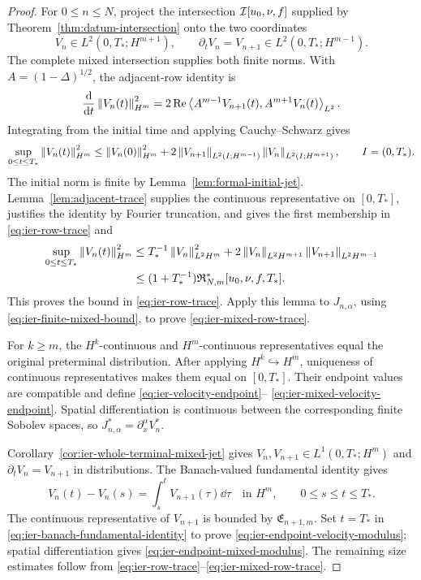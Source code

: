 \begin{proof}
For \(0\le n\le N\), project the intersection
\(\mathcal I[u_0,\nu,f]\) supplied by Theorem~\ref{thm:datum-intersection} onto the two
coordinates
\[
 V_n\in L^2(0,T_*;H^{m+1}),
 \qquad
 \partial_tV_n=V_{n+1}\in L^2(0,T_*;H^{m-1}).
\]
The complete mixed intersection supplies both finite norms.
With \(A=(1-\Delta)^{1/2}\), the adjacent-row identity is
\[
 \frac{\mathrm d}{\mathrm dt}\left\lVert V_n(t)\right\rVert_{H^m}^2
 =2\operatorname{Re}\left\langle A^{m-1}V_{n+1}(t),A^{m+1}V_n(t)\right\rangle_{L^2}.
\]
Integrating from the initial time and applying Cauchy--Schwarz gives
\begin{equation}
 \sup_{0\le t\le T_*}\left\lVert V_n(t)\right\rVert_{H^m}^2
 \le\left\lVert V_n(0)\right\rVert_{H^m}^2
 +2\left\lVert V_{n+1}\right\rVert_{L^2(I;H^{m-1})}
    \left\lVert V_n\right\rVert_{L^2(I;H^{m+1})},
 \qquad I=(0,T_*).
 \label{eq:ier-initial-row-trace-bound}
\end{equation}
The initial norm is finite by Lemma~\ref{lem:formal-initial-jet}.
Lemma~\ref{lem:adjacent-trace} supplies the continuous representative
on \([0,T_*]\), justifies the identity by Fourier truncation, and gives the
first membership in
\eqref{eq:ier-row-trace} and
\begin{align*}
 \sup_{0\le t\le T_*}\left\lVert V_n(t)\right\rVert_{H^m}^2
 &\le T_*^{-1}\left\lVert V_n\right\rVert_{L^2H^m}^2
 +2\left\lVert V_n\right\rVert_{L^2H^{m+1}}\left\lVert V_{n+1}\right\rVert_{L^2H^{m-1}}\\
 &\le(1+T_*^{-1})\mathfrak R_{N,m}^*[u_0,\nu,f,T_*].
\end{align*}
This proves the bound in \eqref{eq:ier-row-trace}.  Apply this lemma to
\(J_{n,\alpha}\), using \eqref{eq:ier-finite-mixed-bound}, to prove
\eqref{eq:ier-mixed-row-trace}.

For \(k\ge m\), the \(H^k\)-continuous and \(H^m\)-continuous
representatives equal the original preterminal distribution.  After applying
\(H^k\hookrightarrow H^m\), uniqueness of continuous representatives makes
them equal on \([0,T_*]\).  Their endpoint values are compatible and define
\eqref{eq:ier-velocity-endpoint}--%
\eqref{eq:ier-mixed-velocity-endpoint}.  Spatial differentiation is
continuous between the corresponding finite Sobolev spaces, so
\(J_{n,\alpha}^*=\partial_x^\alpha V_n^*\).

Corollary~\ref{cor:ier-whole-terminal-mixed-jet} gives
\(V_n,V_{n+1}\in L^1(0,T_*;H^m)\) and
\(\partial_tV_n=V_{n+1}\) in distributions.  The Banach-valued fundamental
identity gives
\begin{equation}
 V_n(t)-V_n(s)=\int_s^tV_{n+1}(\tau)\dd\tau
 \quad\text{in }H^m,
 \qquad0\le s\le t\le T_*.
 \label{eq:ier-banach-fundamental-identity}
\end{equation}
The continuous representative of \(V_{n+1}\) is bounded by
\(\mathfrak E_{n+1,m}\).  Set \(t=T_*\) in
\eqref{eq:ier-banach-fundamental-identity} to prove
\eqref{eq:ier-endpoint-velocity-modulus}; spatial differentiation gives
\eqref{eq:ier-endpoint-mixed-modulus}.  The remaining size estimates follow
from \eqref{eq:ier-row-trace}--\eqref{eq:ier-mixed-row-trace}.


\end{proof}
